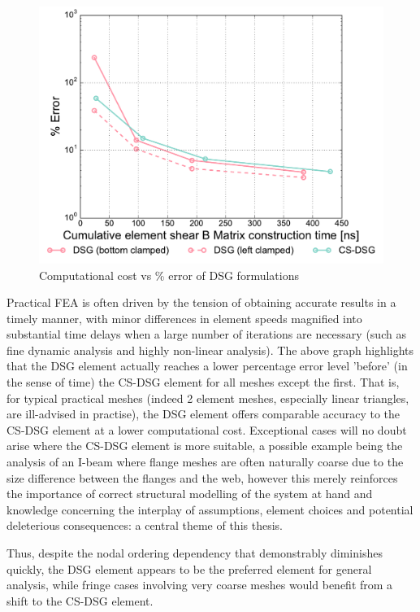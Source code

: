 \begin{figure}[H]
	\centering
	\includegraphics[width=12cm]{images/node_ordering_study_error.pdf}
	\caption{Computational cost vs \% error of DSG formulations}
	\label{fig:Computational cost vs error of DSG formulations}
\end{figure}

Practical FEA is often driven by the tension of obtaining accurate results in a timely manner, with minor differences in element speeds magnified into substantial time delays when a large number of iterations are necessary (such as fine dynamic analysis and highly non-linear analysis). The above graph highlights that the DSG element actually reaches a lower percentage error level 'before' (in the sense of time) the CS-DSG element for all meshes except the first. That is, for typical practical meshes (indeed 2 element meshes, especially linear triangles, are ill-advised in practise), the DSG element offers comparable accuracy to the CS-DSG element at a lower computational cost. Exceptional cases will no doubt arise where the CS-DSG element is more suitable, a possible example being the analysis of an I-beam where flange meshes are often naturally coarse due to the size difference between the flanges and the web, however this merely reinforces the importance of correct structural modelling of the system at hand and knowledge concerning the interplay of assumptions, element choices and potential deleterious consequences: a central theme of this thesis.

Thus, despite the nodal ordering dependency that demonstrably diminishes quickly, the DSG element appears to be the preferred element for general analysis, while fringe cases involving very coarse meshes would benefit from a shift to the CS-DSG element.